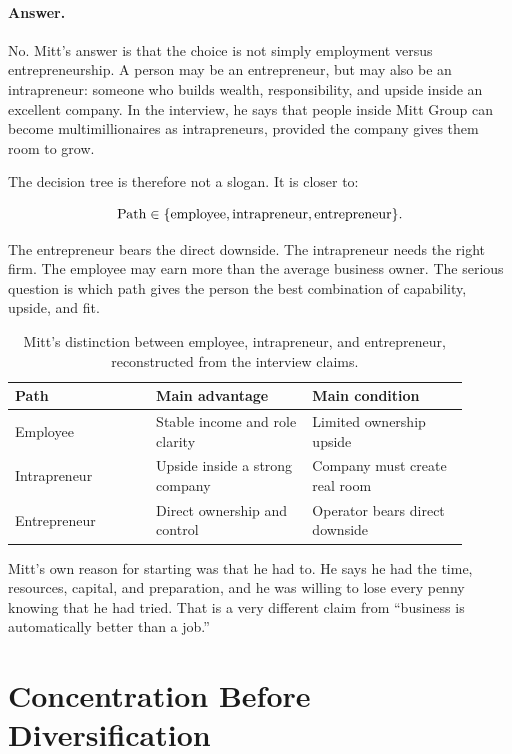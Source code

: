 \paragraph{Answer.}
No. Mitt's answer is that the choice is not simply employment versus entrepreneurship. A person may be an entrepreneur, but may also be an intrapreneur: someone who builds wealth, responsibility, and upside inside an excellent company. In the interview, he says that people inside Mitt Group can become multimillionaires as intrapreneurs, provided the company gives them room to grow.

The decision tree is therefore not a slogan. It is closer to:

\begin{equation}
  \hbox{Path} \in
  \{\hbox{employee},\hbox{intrapreneur},\hbox{entrepreneur}\}.
\end{equation}

The entrepreneur bears the direct downside. The intrapreneur needs the right firm. The employee may earn more than the average business owner. The serious question is which path gives the person the best combination of capability, upside, and fit.

\begin{table}
\centering
\begin{tabular}{p{0.28\linewidth}p{0.31\linewidth}p{0.31\linewidth}}
\hline
Path & Main advantage & Main condition \\
\hline
Employee & Stable income and role clarity & Limited ownership upside \\
Intrapreneur & Upside inside a strong company & Company must create real room \\
Entrepreneur & Direct ownership and control & Operator bears direct downside \\
\hline
\end{tabular}
\caption{Mitt's distinction between employee, intrapreneur, and entrepreneur, reconstructed from the interview claims.}
\end{table}

Mitt's own reason for starting was that he had to. He says he had the time, resources, capital, and preparation, and he was willing to lose every penny knowing that he had tried. That is a very different claim from ``business is automatically better than a job.''

\section{Concentration Before Diversification}

